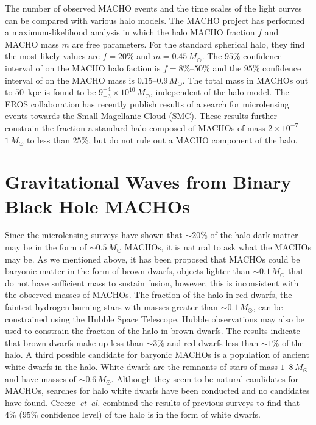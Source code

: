 The number of observed MACHO events and the time scales of the light curves
can be compared with various halo models. The MACHO project has performed a
maximum-likelihood analysis in which the halo MACHO fraction $f$ and MACHO
mass $m$ are free parameters. For the standard spherical halo, they find the
most likely values are $f = 20\%$ and $m = 0.45\,M_\odot$. The $95\%$
confidence interval of on the MACHO halo faction is $f = 8\%$--$50\%$ and the
$95\%$ confidence interval of on the MACHO mass is $0.15$--$0.9\,M_\odot$. The
total mass in MACHOs out to $50$~kpc is found to be $9_{-3}^{+4} \times
10^{10}\,M_\odot$, independent of the halo model\cite{Alcock:2000ph}.  The
EROS collaboration has recently publish results of a search for microlensing
events towards the Small Magellanic Cloud (SMC)\cite{Afonso:2002xq}. These
results further constrain the fraction a standard halo composed of MACHOs of
mass $2 \times 10^{-7}$--$1\, M_\odot$ to less than $25\%$, but do not rule
out a MACHO component of the halo.

\section{Gravitational Waves from Binary Black Hole MACHOs}
\label{s:bbhmacho}

Since the microlensing surveys have shown that $\sim 20\%$ of the halo dark
matter may be in the form of $\sim 0.5\,M_\odot$ MACHOs, it is natural to ask
what the MACHOs may be. As we mentioned above, it has been proposed that
MACHOs could be baryonic matter in the form of brown dwarfs, objects lighter
than $\sim 0.1\,M_\odot$ that do not have sufficient mass to sustain fusion,
however, this is inconsistent with the observed masses of MACHOs. The fraction
of the halo in red dwarfs, the faintest hydrogen burning stars with masses
greater than $\sim 0.1\,M_\odot$, can be constrained using the Hubble Space
Telescope. Hubble observations may also be used to constrain the fraction of
the halo in brown dwarfs. The results indicate that brown dwarfs make up less
than $\sim 3\%$ and red dwarfs less than $\sim 1\%$ of the
halo\cite{Graff:1995ru,Graff:1996rz}.  A third possible candidate for baryonic
MACHOs is a population of ancient white dwarfs in the halo. White dwarfs are
the remnants of stars of mass $1$--$8\,M_\odot$ and have masses of $\sim
0.6\,M_\odot$. Although they seem to be natural candidates for MACHOs,
searches for halo white dwarfs have been conducted and no candidates have
found\cite{2002A&A...389L..69G,2002ApJ...573..644N,Creze:2004gs}.
Creeze~\emph{et~al.} combined the results of previous surveys to find that
$4\%$ ($95\%$ confidence level) of the halo is in the form of white
dwarfs\cite{Creze:2004gs}. 

